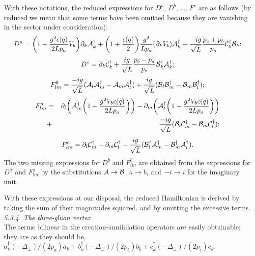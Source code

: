 \documentclass[a4paper,12pt]{article}
\begin{document}
With these notations, the reduced expressions for 
$D^a$, $D^b$, \ldots, $F^c$ 
are as follows (by reduced we mean that 
some terms have  been omitted 
because they are vanishing in the sector under consideration):
\begin{equation}
\label{da}
D^a = \bigg(1-\frac{g^2\epsilon(q)}{2Lp_a}V_b \bigg)\partial_k
{\cal A}_k^\dagger + \bigg(1+\frac{\epsilon(q)}{2}\bigg)
\frac{g^2}{Lp_a}
(\partial_kV_b){\cal A}_k^\dagger
+\frac{-ig}{\sqrt{L}}\frac{p_c+p_b}{p_a}{\cal C}_k^\dagger{\cal B}_k;
\end{equation}
\begin{equation}
\label{dc}
D^c = \partial_k{\cal C}_k^\dagger + 
\frac{ig}{\sqrt{L}}\frac{p_b-p_a}{p_c}{\cal B}_k^\dagger{\cal A}_k^\dagger;
\end{equation}
\begin{equation}
\label{f0}
F^0_{lm} = \frac{-ig}{\sqrt{L}}({\cal A}_l{\cal A}^\dagger_m - {\cal A}_m
{\cal A}^\dagger_l)
+ \frac{ig}{\sqrt{L}}({\cal B}_l{\cal B}^\dagger_m - {\cal B}_m
{\cal B}^\dagger_l);
\end{equation}
\begin{eqnarray}
\label{fa}
F^a_{lm} & = & \partial_l \bigg({\cal A}_m^\dagger 
\bigg(1-\frac{g^2V_b\epsilon(q)}{2Lp_a}\bigg)\bigg)-
\partial_m \bigg({\cal A}_l^\dagger 
\bigg(1-\frac{g^2V_b\epsilon(q)}{2Lp_a}\bigg)\bigg) \nonumber \\
& + & \frac{-ig}{\sqrt{L}}({\cal B}_l{\cal C}_m^\dagger 
- {\cal B}_m {\cal C}_l^\dagger);
\end{eqnarray}
\begin{equation}
\label{fc}
F^c_{lm} = \partial_l{\cal C}_m^\dagger - \partial_m{\cal C}_l^\dagger -
\frac{ig}{\sqrt{L}}({\cal B}^\dagger_l{\cal A}^\dagger_m - 
{\cal B}^\dagger_m{\cal A}^\dagger_l).
\end{equation}
The two missing expressions for $D^b$ and $F^b_{lm}$ are obtained from the 
expressions for $D^a$ and $F^a_{lm}$ by the substitutions ${\cal A}\rightarrow 
{\cal B}$, $a\rightarrow b$, and
$-i\rightarrow i$ for the imaginary unit.

With these expressions at our disposal, the reduced Hamiltonian is derived by 
taking the sum of 
their magnitudes squared, and by omitting the excessive terms.\\

{\it 5.3.4. The three-gluon vertex}\\

The terms bilinear in the creation-annihilation operators are easily 
obtainable;  
they are as they should be, 
$a^\dagger_k(-\Delta_\perp)/(2p_a)a_k + 
b^\dagger_k(-\Delta_\perp)/(2p_b)b_k +
c^\dagger_k(-\Delta_\perp)/(2p_c)c_k$.
\end{document}
